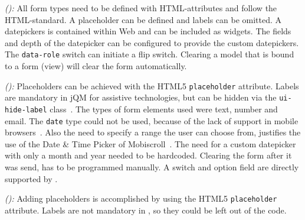 \documentclass[a4paper]{artikel3}
\newcommand{\term}[1]{\emph{#1}}
\newcommand{\code}[1]{\texttt{#1}}
\newcommand{\framework}[2]{ \emph{#1 (\textbf{#2}): }} %
\begin{document}
\framework{\kendoa}{}
All form types need to be defined with HTML-attributes and follow the HTML-standard.
A placeholder can be defined and labels can be omitted.
A datepickers is contained within \kendo{} Web and can be included as widgets.
The fields and depth of the datepicker can be configured to provide the custom datepickers.
The \code{data-role} switch can initiate a flip switch.
Clearing a model that is bound to a form (view) will clear the form automatically.

\framework{\jqma}{}
Placeholders can be achieved with the HTML5 \code{placeholder} attribute.
Labels are mandatory in jQM for assistive technologies, but can be hidden via the \code{ui-hide-label} class~\cite{JQuery2013}. 
The types of form elements used were text, number and email.
The \code{date} type could not be used, because of the lack of support in mobile browsers~\cite{Deveria2013b}.
Also the need to specify a range the user can choose from, justifies the use of the Date \& Time Picker of Mobiscroll~\cite{Mobiscroll2013}.
The need for a custom datepicker with only a month and year needed to be hardcoded.
Clearing the form after it was send, has to be programmed manually.
A switch and option field are directly supported by \jqma.

\framework{\lungoa}{}
Adding placeholders is accomplished by using the HTML5 \code{placeholder} attribute.
Labels are not mandatory in \lungo{}, so they could be left out of the code.

%
\end{document}
